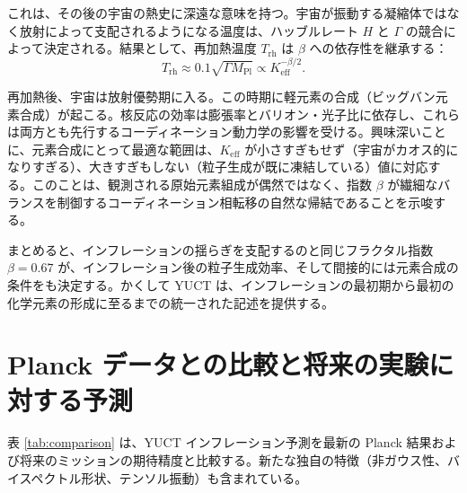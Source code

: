\documentclass[11pt,a4paper]{article}
\newcommand{\Keff}{K_{\mathrm{eff}}}
\begin{document}
	これは、その後の宇宙の熱史に深遠な意味を持つ。宇宙が振動する凝縮体ではなく放射によって支配されるようになる温度は、ハッブルレート \(H\) と \(\Gamma\) の競合によって決定される。結果として、再加熱温度 \(T_{\mathrm{rh}}\) は \(\beta\) への依存性を継承する：
	\begin{equation}
		T_{\mathrm{rh}} \approx 0.1 \sqrt{\Gamma M_{\mathrm{Pl}}} \propto \Keff^{-\beta/2}.
		\label{eq:trh}
	\end{equation}
	
	再加熱後、宇宙は放射優勢期に入る。この時期に軽元素の合成（ビッグバン元素合成）が起こる。核反応の効率は膨張率とバリオン・光子比に依存し、これらは両方とも先行するコーディネーション動力学の影響を受ける。興味深いことに、元素合成にとって最適な範囲は、\(\Keff\) が小さすぎもせず（宇宙がカオス的になりすぎる）、大きすぎもしない（粒子生成が既に凍結している）値に対応する。このことは、観測される原始元素組成が偶然ではなく、指数 \(\beta\) が繊細なバランスを制御するコーディネーション相転移の自然な帰結であることを示唆する。
	
	まとめると、インフレーションの揺らぎを支配するのと同じフラクタル指数 \(\beta = 0.67\) が、インフレーション後の粒子生成効率、そして間接的には元素合成の条件をも決定する。かくして YUCT は、インフレーションの最初期から最初の化学元素の形成に至るまでの統一された記述を提供する。
	
	\section{Planck データとの比較と将来の実験に対する予測}
	\label{sec:comparison}
	
	表 \ref{tab:comparison} は、YUCT インフレーション予測を最新の Planck 結果および将来のミッションの期待精度と比較する。新たな独自の特徴（非ガウス性、バイスペクトル形状、テンソル振動）も含まれている。
	
\end{document}
